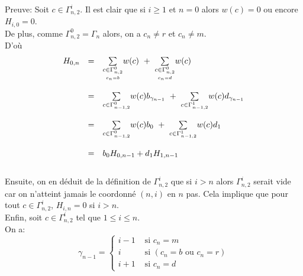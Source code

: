 Preuve:
Soit $c \in \Gamma_{n,2}^{i}$. Il est clair que si $i\geq 1$ et $n=0$ alors $w(c)=0$ ou encore $H_{i, 0}=0$. \\
De plus, comme $\Gamma_{n, 2}^{0}=\Gamma_{n}$ alors, on a $c_{n}\neq r$ et $c_{n}\neq m$.\vspace{5pt}\\
D'où
\[
	\begin{array}{l l l}
		H_{0, n} & =       & \underset{\underset{c_{n}=b}{c\in \Gamma_{n,2}^{0}}}{\sum}w(c)
		\text{ }+\text{ }\underset{\underset{c_{n}=d}{c\in \Gamma_{n,2}^{0}}}{\sum}
		w(c)                                                                                        \\
		         & \text{} &                                                                        \\
		         & =       & \underset{c\in \Gamma_{n-1,2}^{0}}{\sum}w(c)b_{\gamma_{n-1}} \text{ }+
		\text{ }\underset{c\in \Gamma_{n-1,2}^{1}}{\sum}w(c)d_{\gamma_{n-1}}                        \\
		         & \text{} &                                                                        \\
		         & =       & \underset{c\in \Gamma_{n-1,2}^{0}}{\sum}w(c)b_{0} \text{ }+\text{ }
		\underset{c\in \Gamma_{n-1,2}^{1}}{\sum}w(c)d_{1}                                           \\
		         & \text{} &                                                                        \\
		         & =       & b_{0}H_{0,n-1}+d_{1}H_{1,n-1}
	\end{array}
\]\\Ensuite, on en déduit de la
définition de $\Gamma_{n,2}^{i}$ que si $i>n$ alors $\Gamma_{n,2}^{i}$ serait vide car on n'atteint jamais le coordonné $(n,i)$ en $n$ pas. Cela implique que pour tout $c \in \Gamma_{n,2}^{i}$, $H_{i,n}=0$ si $i>n$.\vspace{10pt}\\ Enfin, soit $c \in \Gamma_{n,2}^{i}$ tel que $1\leq i\leq n$.\\
On a:
$$
	\gamma_{n-1} = \begin{cases}
		i-1 & \text{ si }c_{n}=m                       \\
		i   & \text{ si }(c_{n}=b \text{ ou } c_{n}=r) \\
		i+1 & \text{ si }c_{n}=d
	\end{cases}
$$\\
